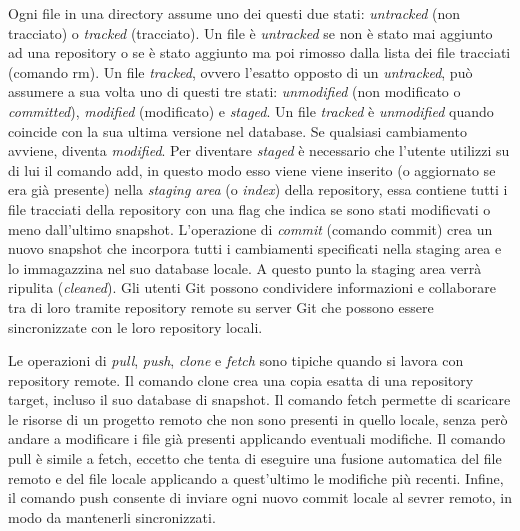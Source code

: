 Ogni file in una directory assume uno dei questi due stati:
\emph{untracked} (non tracciato) o \emph{tracked} (tracciato).
Un file è \emph{untracked} se non è stato mai aggiunto ad una repository o se è stato
aggiunto ma poi rimosso dalla lista dei file tracciati (comando \textsf{rm}).
Un file \emph{tracked}, ovvero l’esatto opposto di un \emph{untracked}, può assumere a sua volta uno di questi tre
stati: \emph{unmodified} (non modificato o \emph{committed}), \emph{modified} (modificato) e \emph{staged}.
Un file \emph{tracked} è \emph{unmodified} quando coincide con la sua ultima versione nel database.
Se qualsiasi cambiamento avviene, diventa \emph{modified}.
Per diventare \emph{staged} è necessario che l’utente utilizzi su di lui il comando \textsf{add},
in questo modo esso viene viene inserito (o aggiornato se era già presente) nella \emph{staging area}
(o \emph{index}) della repository, essa contiene tutti i file tracciati della repository con una flag
che indica se sono stati modificvati o meno dall’ultimo snapshot.
L’operazione di \emph{commit} (comando \textsf{commit}) crea un nuovo snapshot che incorpora
tutti i cambiamenti specificati nella staging area e lo immagazzina nel suo database locale.
A questo punto la staging area verrà ripulita (\emph{cleaned}).
Gli utenti Git possono condividere informazioni e collaborare tra di loro tramite repository remote
su server Git che possono essere sincronizzate con le loro repository locali.

Le operazioni di \emph{pull}, \emph{push}, \emph{clone} e \emph{fetch}
sono tipiche quando si lavora con repository remote.
Il comando \textsf{clone} crea una copia esatta di una repository target,
incluso il suo database di snapshot.
Il comando \textsf{fetch} permette di scaricare le risorse di un progetto remoto che non sono
presenti in quello locale, senza però andare a modificare i file già presenti
applicando eventuali modifiche.
Il comando \textsf{pull} è simile a \textsf{fetch}, eccetto che tenta di eseguire una fusione
automatica del file remoto e del file locale applicando a quest’ultimo le modifiche più recenti.
Infine, il comando \textsf{push} consente di inviare ogni nuovo commit locale al sevrer remoto,
in modo da mantenerli sincronizzati.


